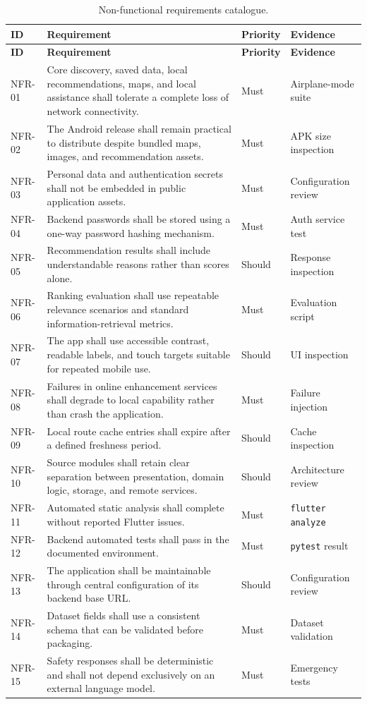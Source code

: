 \clearpage
\begin{longtable}{p{1.4cm}p{8.7cm}p{2.0cm}p{2.2cm}}
\caption{Non-functional requirements catalogue.}\label{tbl:nonfunctional_requirements}\\
\toprule
\textbf{ID} & \textbf{Requirement} & \textbf{Priority} & \textbf{Evidence} \\
\midrule
\endfirsthead
\toprule
\textbf{ID} & \textbf{Requirement} & \textbf{Priority} & \textbf{Evidence} \\
\midrule
\endhead
NFR-01 & Core discovery, saved data, local recommendations, maps, and local assistance shall tolerate a complete loss of network connectivity. & Must & Airplane-mode suite \\
NFR-02 & The Android release shall remain practical to distribute despite bundled maps, images, and recommendation assets. & Must & APK size inspection \\
NFR-03 & Personal data and authentication secrets shall not be embedded in public application assets. & Must & Configuration review \\
NFR-04 & Backend passwords shall be stored using a one-way password hashing mechanism. & Must & Auth service test \\
NFR-05 & Recommendation results shall include understandable reasons rather than scores alone. & Should & Response inspection \\
NFR-06 & Ranking evaluation shall use repeatable relevance scenarios and standard information-retrieval metrics. & Must & Evaluation script \\
NFR-07 & The app shall use accessible contrast, readable labels, and touch targets suitable for repeated mobile use. & Should & UI inspection \\
NFR-08 & Failures in online enhancement services shall degrade to local capability rather than crash the application. & Must & Failure injection \\
NFR-09 & Local route cache entries shall expire after a defined freshness period. & Should & Cache inspection \\
NFR-10 & Source modules shall retain clear separation between presentation, domain logic, storage, and remote services. & Should & Architecture review \\
NFR-11 & Automated static analysis shall complete without reported Flutter issues. & Must & \texttt{flutter analyze} \\
NFR-12 & Backend automated tests shall pass in the documented environment. & Must & \texttt{pytest} result \\
NFR-13 & The application shall be maintainable through central configuration of its backend base URL. & Should & Configuration review \\
NFR-14 & Dataset fields shall use a consistent schema that can be validated before packaging. & Must & Dataset validation \\
NFR-15 & Safety responses shall be deterministic and shall not depend exclusively on an external language model. & Must & Emergency tests \\
\bottomrule
\end{longtable}

